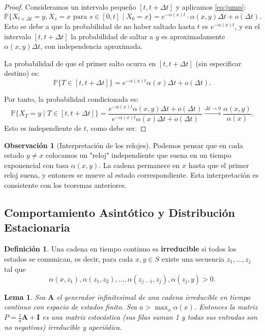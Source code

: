 \documentclass{article}
\theoremstyle{plain}
\newtheorem{Lema}[Teorema]{Lema}
\theoremstyle{definition}
\newtheorem{Definicion}[Teorema]{Definici\'on}
\newtheorem{Observacion}[Teorema]{Observaci\'on}
\newcommand{\Prob}{\mathbb{P}}
\newcommand{\A}{\mathbf{A}}
\newcommand{\I}{\mathbf{I}}
\begin{document}
\begin{proof}
  Consideramos un intervalo peque\~no $[t, t+\Delta t]$ y aplicamos \eqref{eq:jump}:
  \[ \Prob\{X_{t+\Delta t} = y, X_s = x \text{ para } s \in [0,t] \mid X_0 = x\} = e^{-\alpha(x)t} \cdot \alpha(x,y)\Delta t + o(\Delta t). \]
  Esto se debe a que la probabilidad de no haber saltado hasta $t$ es $e^{-\alpha(x)t}$, y en el intervalo $[t,t+\Delta t]$ la probabilidad de saltar a $y$ es aproximadamente $\alpha(x,y)\Delta t$, con independencia aproximada.

  La probabilidad de que el primer salto ocurra en $[t, t+\Delta t]$ (sin especificar destino) es:
  \[ \Prob\{T \in [t,t+\Delta t]\} = e^{-\alpha(x)t}\alpha(x)\Delta t + o(\Delta t). \]

  Por tanto, la probabilidad condicionada es:
  \[ \Prob\{X_T = y \mid T \in [t,t+\Delta t]\} = \frac{e^{-\alpha(x)t}\alpha(x,y)\Delta t + o(\Delta t)}{e^{-\alpha(x)t}\alpha(x)\Delta t + o(\Delta t)} \xrightarrow{\Delta t \to 0} \frac{\alpha(x,y)}{\alpha(x)}. \]
  Esto es independiente de $t$, como debe ser.
\end{proof}

\begin{Observacion}[Interpretaci\'on de los relojes]
  Podemos pensar que en cada estado $y \neq x$ colocamos un "reloj" independiente que suena en un tiempo exponencial con tasa $\alpha(x,y)$. La cadena permanece en $x$ hasta que el primer reloj suena, y entonces se mueve al estado correspondiente. Esta interpretaci\'on es consistente con los teoremas anteriores.
\end{Observacion}

\subsection{Comportamiento Asint\'otico y Distribuci\'on Estacionaria}

\begin{Definicion}
  Una cadena en tiempo continuo es \textbf{irreducible} si todos los estados se comunican, es decir, para cada $x, y \in S$ existe una secuencia $z_1, \ldots, z_j$ tal que
  \[ \alpha(x,z_1), \alpha(z_1,z_2), \ldots, \alpha(z_{j-1},z_j), \alpha(z_j,y) > 0. \]
\end{Definicion}

\begin{Lema}
  Sea $\A$ el generador infinitesimal de una cadena irreducible en tiempo continuo con espacio de estados finito. Sea $a > \max_x \alpha(x)$. Entonces la matriz $P = \frac{1}{a}\A + \I$ es una matriz estoc\'astica (sus filas suman 1 y todas sus entradas son no negativas) irreducible y aperi\'odica.
\end{Lema}
\end{document}

